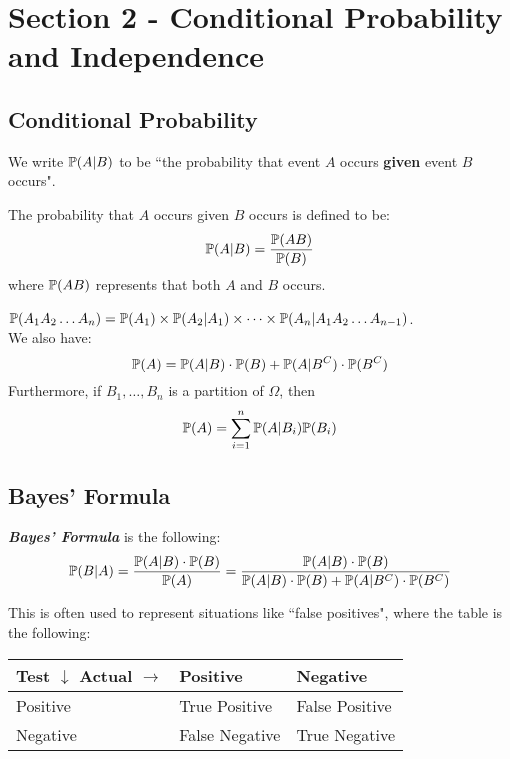 \section{Section 2 - Conditional Probability and Independence}
\subsection{Conditional Probability}
We write $\mathbb{P}(A | B)$ to be ``the probability that event $A$ occurs \textbf{given} event $B$ occurs".
\begin{definition}
    The probability that $A$ occurs given $B$ occurs is defined to be:
    $$\mathbb{P}(A|B) = \frac{\mathbb{P}(AB)}{\mathbb{P}(B)}$$
    where $\mathbb{P}(AB)$ represents that both $A$ and $B$ occurs.
\end{definition}
\begin{theorem}
    $\mathbb{P}(A_1A_2\dots A_n) = \mathbb{P}(A_1) \times \mathbb{P}(A_2 | A_1) \times \dots \times \mathbb{P}(A_n | A_1A_2\dots A_{n-1})$. \\
    We also have:
    $$\mathbb{P}(A) = \mathbb{P}(A|B) \cdot \mathbb{P}(B) + \mathbb{P}(A|B^C) \cdot \mathbb{P}(B^C)$$
    Furthermore, if $B_1, \dots, B_n$ is a partition of $\Omega$, then
    $$\mathbb{P}(A) = \sum_{i = 1}^n \mathbb{P}(A|B_i)\mathbb{P}(B_i)$$
\end{theorem}

\subsection{Bayes' Formula}
\begin{theorem}
    \textbf{\textit{Bayes' Formula}} is the following:
    $$\mathbb{P}(B|A) = \frac{\mathbb{P}(A|B) \cdot \mathbb{P}(B)}{\mathbb{P}(A)} = \frac{\mathbb{P}(A|B) \cdot \mathbb{P}(B)}{\mathbb{P}(A|B) \cdot \mathbb{P}(B) + \mathbb{P}(A|B^C) \cdot \mathbb{P}(B^C)}$$
\end{theorem}
This is often used to represent situations like ``false positives", where the table is the following: \par
{
\centering
\begin{tabular}{|l|l|l|} 
    \hline
    Test $\downarrow$ Actual $\rightarrow$ & Positive       & Negative        \\ 
    \hline
    Positive & True Positive  & False Positive  \\ 
    \hline
    Negative & False Negative & True Negative   \\
    \hline
\end{tabular}\par
}

